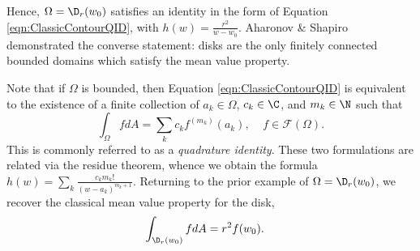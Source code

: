 \documentclass{article}
\numberwithin{equation}{section}
\begin{document}
Hence, $\Omega=\D_r(w_0)$ satisfies an identity in the form of Equation \ref{eqn:ClassicContourQID}, with $h(w)=\frac{r^2}{w-w_0}$. Aharonov \& Shapiro \cite{AharonovShapiro} demonstrated the converse statement: disks are the only finitely connected bounded domains which satisfy the mean value property.

Note that if $\Omega$ is bounded, then Equation \ref{eqn:ClassicContourQID} is equivalent to the existence of a finite collection of $a_k\in\Omega$, $c_k\in\C$, and $m_k\in\N$ such that
\begin{equation}\label{eqn:ClassicPtQID}
\int_{\Omega}fdA=\sum_{k}c_kf^{(m_k)}(a_k),\;\;\;\;f\in\mathcal{F}(\Omega).
\end{equation}
This is commonly referred to as a \emph{quadrature identity}. These two formulations are related via the residue theorem, whence we obtain the formula $h(w)=\sum_{k}\frac{c_km_k!}{(w-a_k)^{m_k+1}}$. Returning to the prior example of $\Omega=\D_r(w_0)$, we recover the classical mean value property for the disk,
\begin{align*}
    \int_{\D_r(w_0)}fdA&=r^2f(w_0).
\end{align*}
\end{document}

